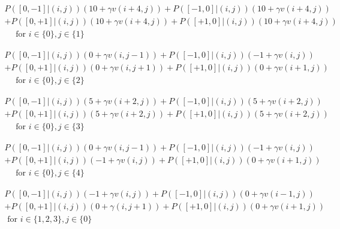 \documentclass[11pt]{article}
\begin{document}
\begin{equation}
\begin{array}{c}
{P([0,-1] |(i, j))(10+\gamma v(i+4, j))+P([-1,0]|(i,j))(10+\gamma v(i+4, j))} \\
{+P([0,+1] |(i, j))(10+\gamma v(i+4, j))+P([+1,0]|(i,j))(10+\gamma v(i+4, j))} \\
{\quad \text { for } i \in\{0\}, j \in\{1\}}
\end{array}
\end{equation}

\begin{equation}
\begin{array}{c}
{P([0,-1] |(i, j))(0+\gamma v(i, j-1))+P([-1,0] |(i, j))(-1+\gamma v(i, j))} \\
{+P([0,+1] |(i, j))(0+\gamma v(i, j+1))+P([+1,0] |(i, j))(0+\gamma v(i+1, j))} \\
{\quad \text { for } i \in\{0\}, j \in\{2\}}
\end{array}
\end{equation}

\begin{equation}
\begin{array}{c}
{P([0,-1] |(i, j))(5+\gamma v(i+2, j))+P([-1,0] |(i, j))(5+\gamma v(i+2, j))} \\
{+P([0,+1] |(i, j))(5+\gamma v(i+2, j))+P([+1,0] |(i, j))(5+\gamma v(i+2, j))} \\
{\quad \text { for } i \in\{0\}, j \in\{3\}}
\end{array}
\end{equation}

\begin{equation}
\begin{array}{c}
{P([0,-1] |(i, j))(0+\gamma v(i, j-1))+P([-1,0] |(i, j))(-1+\gamma v(i, j))} \\
{+P([0,+1] |(i, j))(-1+\gamma v(i, j))+P([+1,0] |(i, j))(0+\gamma v(i+1, j))} \\
{\quad \text { for } i \in\{0\}, j \in\{4\}}
\end{array}
\end{equation}

\begin{equation}
\begin{array}{c}
{P([0,-1] |(i, j))(-1+\gamma v(i, j))+P([-1,0] |(i, j))(0+\gamma v(i-1, j))}\\
{+P([0,+1] |(i, j))(0+\gamma(i, j+1))+P([+1,0] |(i, j))(0+\gamma v(i+1, j))}\\
{\text { for } i \in\{1,2,3\}, j \in\{0\}}
\end{array}
\end{equation}
\end{document}
